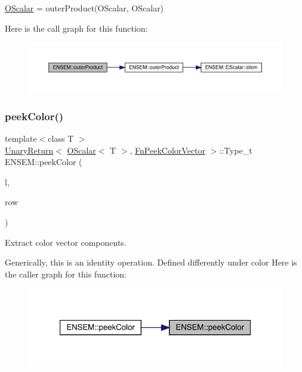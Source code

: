 \mbox{\hyperlink{classENSEM_1_1OScalar}{O\+Scalar}} = outer\+Product(\+O\+Scalar, O\+Scalar) 

Here is the call graph for this function\+:\nopagebreak
\begin{figure}[H]
\begin{center}
\leavevmode
\includegraphics[width=350pt]{d1/d71/group__obsscalar_ga913f8b40c0c15203e199d1bafc122eea_cgraph}
\end{center}
\end{figure}
\mbox{\label{group__obsscalar_ga8f3e69e2d0f4a46a99f719e70d6a13d8}} 
\subsubsection{\texorpdfstring{peekColor()}{peekColor()}\hspace{0.1cm}{\footnotesize\ttfamily [1/2]}}
{\footnotesize\ttfamily template$<$class T $>$ \\
\mbox{\hyperlink{structENSEM_1_1UnaryReturn}{Unary\+Return}}$<$ \mbox{\hyperlink{classENSEM_1_1OScalar}{O\+Scalar}}$<$ T $>$, \mbox{\hyperlink{structENSEM_1_1FnPeekColorVector}{Fn\+Peek\+Color\+Vector}} $>$\+::Type\+\_\+t E\+N\+S\+E\+M\+::peek\+Color (\begin{DoxyParamCaption}\item[{const \mbox{\hyperlink{classENSEM_1_1OScalar}{O\+Scalar}}$<$ T $>$ \&}]{l,  }\item[{int}]{row }\end{DoxyParamCaption})\hspace{0.3cm}{\ttfamily [inline]}}



Extract color vector components. 

Generically, this is an identity operation. Defined differently under color Here is the caller graph for this function\+:\nopagebreak
\begin{figure}[H]
\begin{center}
\leavevmode
\includegraphics[width=321pt]{d1/d71/group__obsscalar_ga8f3e69e2d0f4a46a99f719e70d6a13d8_icgraph}
\end{center}
\end{figure}
\mbox{\label{group__obsscalar_gabb496d1fb0c0682ec483697e6dae0e32}} 
